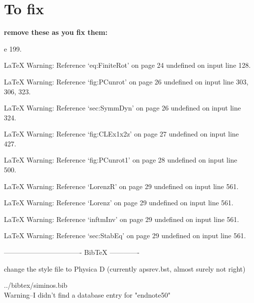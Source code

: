
\section*{To fix}

{\bf remove these as you fix them:}





e 199.




LaTeX Warning: Reference `eq:FiniteRot' on page 24 undefined on input line 128.


LaTeX Warning: Reference `fig:PCunrot' on page 26 undefined on input line 303, 306, 323.


LaTeX Warning: Reference `sec:SymmDyn' on page 26 undefined on input line 324.


LaTeX Warning: Reference `fig:CLEx1x2z' on page 27 undefined on input line 427.


LaTeX Warning: Reference `fig:PCunrot1' on page 28 undefined on input line 500.


LaTeX Warning: Reference `LorenzR' on page 29 undefined on input line 561.


LaTeX Warning: Reference `Lorenz' on page 29 undefined on input line 561.


LaTeX Warning: Reference `inftmInv' on page 29 undefined on input line 561.


LaTeX Warning: Reference `sec:StabEq' on page 29 undefined on input line 561.

---------------------------------- BibTeX -------------


change the style file to Physica D (currently apsrev.bst,
almost surely not right)

../bibtex/siminos.bib
\\
Warning--I didn't find a database entry for "endnote50"
